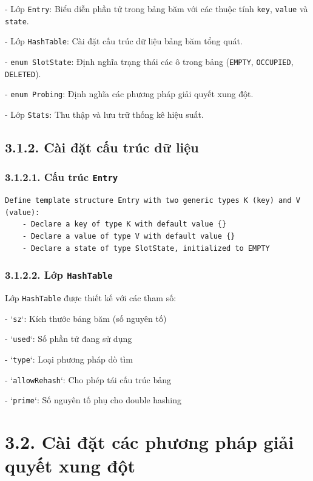 \documentclass[12pt,a4paper]{report}
\begin{document}
- Lớp \texttt{Entry}: Biểu diễn phần tử trong bảng băm với các thuộc tính \texttt{key}, \texttt{value} và \texttt{state}.

- Lớp \texttt{HashTable}: Cài đặt cấu trúc dữ liệu bảng băm tổng quát.

- \texttt{enum SlotState}: Định nghĩa trạng thái các ô trong bảng (\texttt{EMPTY}, \texttt{OCCUPIED}, \texttt{DELETED}).

- \texttt{enum Probing}: Định nghĩa các phương pháp giải quyết xung đột.

- Lớp \texttt{Stats}: Thu thập và lưu trữ thống kê hiệu suất.

\subsection*{3.1.2. Cài đặt cấu trúc dữ liệu}

\subsubsection*{3.1.2.1. Cấu trúc \texttt{Entry}}
\begin{lstlisting}[style=numbered]
Define template structure Entry with two generic types K (key) and V (value):
    - Declare a key of type K with default value {}
    - Declare a value of type V with default value {}
    - Declare a state of type SlotState, initialized to EMPTY
\end{lstlisting}

\subsubsection*{3.1.2.2. Lớp \texttt{HashTable}}

\noindent \indent Lớp \texttt{HashTable} được thiết kế với các tham số:

- `\texttt{sz}`: Kích thước bảng băm (số nguyên tố)

- `\texttt{used}`: Số phần tử đang sử dụng

- `\texttt{type}`: Loại phương pháp dò tìm

- `\texttt{allowRehash}`: Cho phép tái cấu trúc bảng

- `\texttt{prime}`: Số nguyên tố phụ cho double hashing

\section*{3.2. Cài đặt các phương pháp giải quyết xung đột}
\end{document}
